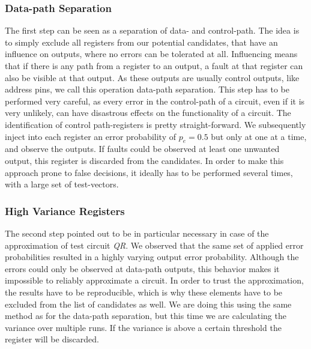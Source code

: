 \documentclass[conference]{IEEEtran}
\begin{document}
\subsubsection{Data-path Separation}
The first step can be seen as a separation of data- and control-path. The idea is to simply exclude all registers from our potential candidates, that have an influence on outputs, where no errors can be tolerated at all. Influencing means that if there is any path from a register to an output, a fault at that register can also be visible at that output. As these outputs are usually control outputs, like address pins, we call this operation data-path separation. This step has to be performed very careful, as every error in the control-path of a circuit, even if it is very unlikely, can have disastrous effects on the functionality of a circuit. The identification of control path-registers is pretty straight-forward. We subsequently inject into each register an error probability of $p_e=0.5$ but only at one at a time, and observe the outputs. If faults could be observed at least one unwanted output, this register is discarded from the candidates. In order to make this approach prone to false decisions, it ideally has to be performed several times, with a large set of test-vectors.
\subsubsection{High Variance Registers}
\label{subsubsec:high_v}
The second step pointed out to be in particular necessary in case of the approximation of test circuit \emph{QR}. We observed that the same set of applied error probabilities resulted in a highly varying output error probability. Although the errors could only be observed at data-path outputs, this behavior makes it impossible to reliably approximate a circuit. In order to trust the approximation, the results have to be reproducible, which is why these elements have to be excluded from the list of candidates as well. We are doing this using the same method as for the data-path separation, but this time we are calculating the variance over multiple runs. If the variance is above a certain threshold the register will be discarded.
\end{document}
